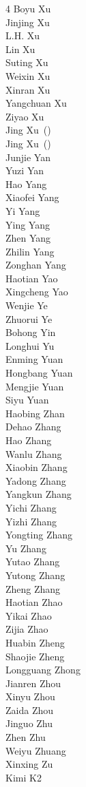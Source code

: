 \begin{multicols}{4}
Boyu Xu\\
Jinjing Xu\\
L.H. Xu\\
Lin Xu\\
Suting Xu\\
Weixin Xu\\
Xinran Xu\\
Yangchuan Xu\\
Ziyao Xu\\
Jing Xu~()\\
Jing Xu~()\\
Junjie Yan\\
Yuzi Yan\\
Hao Yang\\
Xiaofei Yang\\
Yi Yang\\
Ying Yang\\
Zhen Yang\\
Zhilin Yang\\
Zonghan Yang\\
Haotian Yao\\
Xingcheng Yao\\
Wenjie Ye\\
Zhuorui Ye\\
Bohong Yin\\
Longhui Yu\\
Enming Yuan\\
Hongbang Yuan\\
Mengjie Yuan\\
Siyu Yuan\\
Haobing Zhan\\
Dehao Zhang\\
Hao Zhang\\
Wanlu Zhang\\
Xiaobin Zhang\\
Yadong Zhang\\
Yangkun Zhang\\
Yichi Zhang\\
Yizhi Zhang\\
Yongting Zhang\\
Yu Zhang\\
Yutao Zhang\\
Yutong Zhang\\
Zheng Zhang\\
Haotian Zhao\\
Yikai Zhao\\
Zijia Zhao\\
Huabin Zheng\\
Shaojie Zheng\\
Longguang Zhong\\
Jianren Zhou\\
Xinyu Zhou\\
Zaida Zhou\\
Jinguo Zhu\\
Zhen Zhu\\
Weiyu Zhuang\\
Xinxing Zu\\
Kimi K2\\
\end{multicols}
\newpage